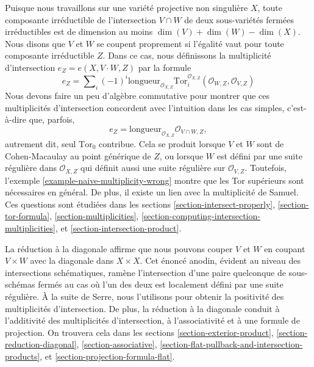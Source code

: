 \medskip\noindent
Puisque nous travaillons sur une variété projective non singulière $X$, toute composante irréductible
de l'intersection $V \cap W$ de deux sous-variétés fermées irréductibles
est de dimension au moins $\dim(V) + \dim(W) - \dim(X)$. Nous disons que $V$ et $W$
se coupent proprement si l'égalité vaut pour toute composante irréductible $Z$.
Dans ce cas, nous définissons la multiplicité d'intersection
$e_Z = e(X, V \cdot W, Z)$ par la formule
$$
e_Z = \sum\nolimits_i
(-1)^i
\text{longueur}_{\mathcal{O}_{X, Z}}
\text{Tor}_i^{\mathcal{O}_{X, Z}}(\mathcal{O}_{W, Z}, \mathcal{O}_{V, Z})
$$
Nous devons faire un peu d'algèbre commutative pour montrer que ces
multiplicités d'intersection concordent avec l'intuition dans les cas simples,
c'est-à-dire que, parfois,
$$
e_Z = \text{longueur}_{\mathcal{O}_{X, Z}} \mathcal{O}_{V \cap W, Z},
$$
autrement dit, seul $\text{Tor}_0$ contribue. Cela se produit lorsque
$V$ et $W$ sont de Cohen-Macaulay au point générique de $Z$, ou lorsque
$W$ est défini par une suite régulière dans $\mathcal{O}_{X, Z}$ qui
définit aussi une suite régulière sur $\mathcal{O}_{V, Z}$. Toutefois,
l'exemple \ref{example-naive-multiplicity-wrong} montre que les Tor supérieurs
sont nécessaires en général. De plus, il existe un lien
avec la multiplicité de Samuel. Ces questions sont étudiées dans les
sections
\ref{section-intersect-properly},
\ref{section-tor-formula},
\ref{section-multiplicities},
\ref{section-computing-intersection-multiplicities}, et
\ref{section-intersection-product}.

\medskip\noindent
La réduction à la diagonale affirme que nous pouvons couper
$V$ et $W$ en coupant $V \times W$ avec la diagonale dans $X \times X$.
Cet énoncé anodin, évident au niveau des intersections
schématiques, ramène l'intersection d'une paire quelconque
de sous-schémas fermés au cas où l'un des deux est localement défini
par une suite régulière. À la suite de Serre, nous l'utilisons pour obtenir la positivité
des multiplicités d'intersection. De plus, la réduction à la diagonale
conduit à l'additivité des multiplicités d'intersection, à l'associativité et à une
formule de projection. On trouvera cela dans les sections
\ref{section-exterior-product},
\ref{section-reduction-diagonal},
\ref{section-associative},
\ref{section-flat-pullback-and-intersection-products}, et
\ref{section-projection-formula-flat}.

